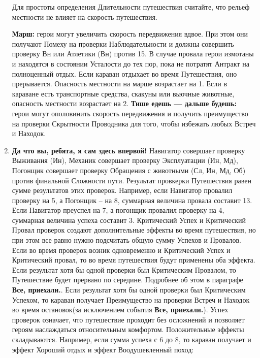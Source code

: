\begin{enumerate}
\begin{center}
\end{center}
\begin{tcolorbox}
Для простоты определения Длительности путешествия считайте, что рельеф местности не влияет на скорость путешествия.
\end{tcolorbox}
\textbf{Марш:} герои могут увеличить скорость передвижения вдвое. При этом они получают Помеху на проверки Наблюдательности и должны совершить проверку Вн или Атлетики (Вн) против 15. В случае провала герои измотаны и находятся в состоянии Усталости до тех пор, пока не потратят Антракт на полноценный отдых. Если караван отдыхает во время Путешествия, оно прерывается. Опасность местности на марше возрастает на 1. Если в караване есть транспортные средства, скакуны или вьючные животные, опасность местности возрастает на 2.
\newline \textbf{Тише едешь — дальше будешь:} герои могут ополовинить скорость передвижения и получить преимущество на проверки Скрытности Проводника для того, чтобы избежать любых Встреч и Находок.
\item \textbf{Да что вы, ребята, я сам здесь впервой!} Навигатор совершает проверку Выживания (Ин), Механик совершает проверку Эксплуатации (Ин, Мд), Погонщик совершает проверку Обращения с животными (Сл, Ин, Мд, Об) против финальной Сложности пути. Результат провкерки Путешествия равен сумме результатов этих проверок. Например, если Навигатор провалил проверку на 5, а Погонщик – на 8, суммарная величина провала составит 13. Если Навигатор преуспел на 7, а погонщик провалил проверку на 4, суммарная величина успеха составит 3.
\newline Критический Успех и Критический Провал проверок создают дополнительные эффекты во время путешествия, но при этом все равно нужно подсчитать общую сумму Успехов и Провалов. Если во время проверок возник одновременно и Критический Успех и Критический провал, то во время путешествия будут применены оба эффекта.
\newline Если результат хотя бы одной проверки был Критическим Провалом, то Путешествие будет прервано по середине. Подробнее об этом в параграфе \textbf{Все, приехали.}.
\newline Если результат хотя бы одной проверки был Критическим Успехом, то караван получает Преимущество на проверки Встреч и Находок во время остановок(за исключением события \textbf{Все, приехали.}).
\newline
Успех проверок означает, что путешествие проходит без осложнений и позволяет героям наслаждаться относительным комфортом. Положительные эффекты складываются. Например, если сумма успеха с 6 до 8, то караван получает и эффект Хороший отдых и эффект Воодушевленный поход:

\end{enumerate}
